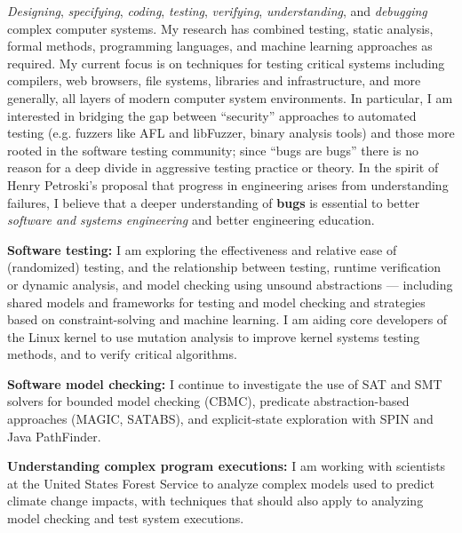 \documentclass[ComputerScience]{vita}
\begin{document}
\begin{vita}
\begin{Research Interests}
\item \emph{Designing}, \emph{specifying}, \emph{coding},
  \emph{testing}, \emph{verifying}, \emph{understanding}, and
  \emph{debugging} complex computer systems.   My research has combined testing, static analysis, formal methods, programming
  languages, and machine learning approaches as required.  My current
  focus is on techniques for testing critical systems including
  compilers, web browsers, file systems, libraries and infrastructure,
  and more generally, all layers of modern computer system
  environments.  In particular, I am interested in bridging the gap
  between ``security'' approaches to automated testing (e.g. fuzzers
  like AFL and libFuzzer, binary analysis tools) and those more rooted in the software
  testing community; since ``bugs are bugs'' there is no reason for a
  deep divide in aggressive testing practice or theory.
  In the spirit of Henry Petroski's proposal that progress in
  engineering arises from understanding failures, I believe that a
  deeper understanding of {\bf bugs} is essential to better
  \emph{software and systems engineering} and better engineering
  education.
\begin{Topics}
\item {\bf Software testing:} I am exploring the effectiveness and relative ease of (randomized) testing, and the relationship between testing, runtime verification or dynamic analysis, and model checking using unsound abstractions --- including shared models and frameworks for testing and model checking and strategies based on constraint-solving and machine learning.  I am aiding core developers of the Linux kernel to use mutation analysis to improve kernel systems testing methods, and to verify critical algorithms. 
\item {\bf Software model checking:}  I continue to investigate the use of SAT and SMT solvers for bounded model checking (CBMC), predicate abstraction-based approaches (MAGIC, SATABS), and explicit-state exploration with SPIN and Java PathFinder. 
\item{\bf Understanding complex program executions:} I am working with scientists at the United States Forest Service to analyze complex models used to predict climate change impacts, with techniques that should also apply to analyzing model checking and test system executions.

\end{Topics}
\end{Research Interests}
\end{vita}
\end{document}
